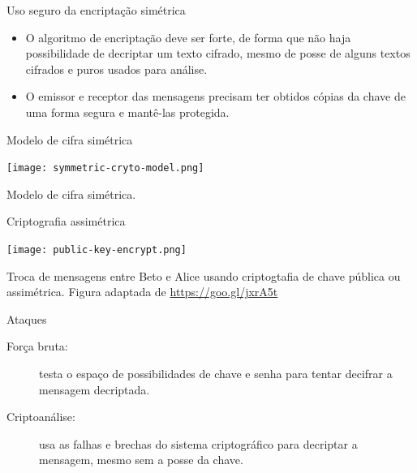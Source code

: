 \begin{frame}{Uso seguro da encriptação simétrica}

\begin{itemize}
\item O algoritmo de encriptação deve ser forte, de forma que não haja
possibilidade de decriptar um texto cifrado, mesmo de posse de alguns
textos cifrados e puros usados para análise. 

\item O emissor e receptor das mensagens precisam ter obtidos cópias da
chave de uma forma segura e mantê-las protegida.
\end{itemize}

\end{frame}

\begin{frame}{Modelo de cifra simétrica}

\begin{center}
\texttt{[image: symmetric-cryto-model.png]}
\end{center}

\scriptsize
Modelo de cifra simétrica.

\end{frame}


 \begin{frame}{Criptografia assimétrica}

 \begin{center}
 \texttt{[image: public-key-encrypt.png]}
 \end{center}

 \scriptsize
 Troca de mensagens entre Beto e Alice usando criptogtafia de chave pública ou assimétrica. Figura adaptada de \url{https://goo.gl/jxrA5t}

 \end{frame}

\begin{frame}{Ataques}

\begin{description}

\item[For\c{c}a bruta:] testa o espa\c{c}o de possibilidades de chave e senha para tentar 
decifrar a mensagem decriptada.

\item[Criptoan\'{a}lise:] usa as falhas e brechas do sistema criptogr\'{a}fico para decriptar 
a mensagem, mesmo sem a posse da chave.
\end{description}
\end{frame}

